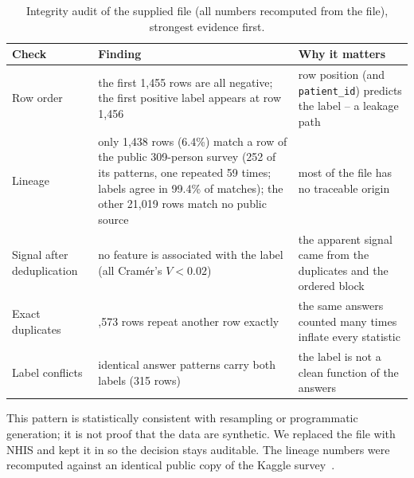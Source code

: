 \begin{table}[htbp]
\centering\small
\caption{Integrity audit of the supplied file (all numbers recomputed from the file), strongest evidence first.}\label{tab:audit}
\begin{tabularx}{\textwidth}{@{}>{\raggedright\arraybackslash}p{2.6cm} >{\raggedright\arraybackslash}X >{\raggedright\arraybackslash}p{4.6cm}@{}}
\toprule
Check & Finding & Why it matters \\
\midrule
Row order & the first 1,455 rows are all negative; the first positive label appears at row 1,456 & row position (and \texttt{patient\_id}) predicts the label -- a leakage path \\
Lineage & only 1,438 rows (6.4\%) match a row of the public 309-person survey (252 of its patterns, one repeated 59 times; labels agree in 99.4\% of matches); the other 21,019 rows match no public source & most of the file has no traceable origin \\
Signal after deduplication & no feature is associated with the label (all Cram\'er's $V < 0.02$) & the apparent signal came from the duplicates and the ordered block \\
Exact duplicates & 2,573 rows repeat another row exactly & the same answers counted many times inflate every statistic \\
Label conflicts & 133 identical answer patterns carry both labels (315 rows) & the label is not a clean function of the answers \\
\bottomrule
\end{tabularx}
\end{table}

This pattern is statistically consistent with resampling or programmatic generation; it is not proof that the data are synthetic. We replaced the file with NHIS and kept it in  so the decision stays auditable. The lineage numbers were recomputed against an identical public copy of the Kaggle survey~\cite{kaggle}.
